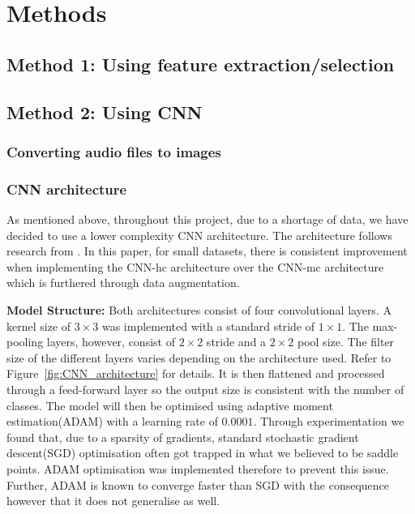 \documentclass[11pt,a4paper,twoside]{article}
\begin{document}

\section{Methods}

\subsection{Method 1: Using feature extraction/selection}

\subsection{Method 2: Using CNN}

\subsubsection{Converting audio files to images}


\subsubsection{CNN architecture}

As mentioned above, throughout this project, due to a shortage of data, we have decided to use a lower complexity CNN architecture. The architecture follows research from \cite{SmallData}. In this paper, for small datasets, there is consistent improvement when implementing the CNN-hc architecture over the CNN-mc architecture which is furthered through data augmentation.

\textbf{Model Structure:} Both architectures consist of four convolutional layers. A kernel size of $3\times3$ was implemented with a standard stride of $1\times1$. The max-pooling layers, however, consist of $2\times2$ stride and a $2\times 2$ pool size. The filter size of the different layers varies depending on the architecture used. Refer to Figure~\ref{fig:CNN_architecture} for details. It is then flattened and processed through a feed-forward layer so the output size is consistent with the number of classes. The model will then be optimised using adaptive moment estimation(ADAM)\cite{ADAM} with a learning rate of $0.0001$. Through experimentation we found that, due to a sparsity of gradients, standard stochastic gradient descent(SGD) optimisation often got trapped in what we believed to be saddle points. ADAM optimisation was implemented therefore to prevent this issue. Further, ADAM is known to converge faster than SGD\cite{SmallData} with the consequence however that it does not generalise as well\cite{SGDvsADAM}.
\end{document}
